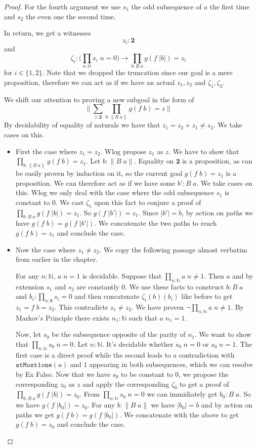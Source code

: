 \documentclass[12pt]{report}
\theoremstyle{definition}
\begin{document}
\begin{proof}
For the fourth argument we use $s_1$ the odd subsequence of $a$ the first time and $s_2$ the even one the second time. 

In return, we get a witnesses 
$$z_i : \mathbf{2}$$
and
$$\zeta_i : \Big(\prod_{n : \mathbb{N}}s_i\; n = 0 \Big)\rightarrow \prod_{b : B\; a} g(f\; |b|) = z_i$$
for $i \in \{1,2\}$.  
Note that we dropped the truncation since our goal is a mere proposition, therefore we can act as if we have an actual $z_1,z_2$ and $\zeta_1, \zeta_2$. 

We shift our attention to proving a new subgoal in the form of 
$$\Big\lVert \sum_{z : \mathbf{2}} \prod_{b : \lVert B\; a\rVert} g(f\; b) = z \Big\rVert$$
By decidability of equality of naturals we have that $z_1 = z_2 + z_1 \neq z_2$. 
We take cases on this. 
\begin{itemize}
\item First the case where $z_1 = z_2$. 
Wlog propose $z_1$ as $z$. 
We have to show that $\prod_{b : \lVert B\;a\rVert}g(f\;b)=z_1$. 
Let $b : \lVert B\;a \rVert$. 
Equality on $\mathbf{2}$ is a proposition, as can be easily proven by induction on it, so the current goal $g(f\;b)=z_1$ is a proposition. 
We can therefore act as if we have some $b' : B\;a$. 
We take cases on this. 
Wlog we only deal with the case where the odd subsequence $s_1$ is constant to $0$. 
We cast $\zeta_1$ upon this fact to conjure a proof of $\prod_{b : B\; a} g(f\; |b|) = z_1$. 
So $g(f\;|b'|) = z_1$. 
Since $|b'| = b$, by action on paths we have $g(f\;b) = g(f\;|b'|)$. 
We concatenate the two paths to reach $g(f\;b) = z_1$ and conclude the case. 

\item Now the case where $z_1 \neq z_2$. 
We copy the following passage almost verbatim from earlier in the chapter. 

For any $n : \mathbb{N}$, $a\; n = 1$ is decidable. 
Suppose that $\prod_{n : 
\mathbb{N}} a\; n \neq 1$. 
Then $a$ and by extension $s_1$ and $s_2$ are constantly $0$. 
We use these facts to construct $b : B\;a$ and $b_i : \prod_{n : \mathtt{N}}s_i = 0$ and then concatenate $\zeta_i(b)(b_i)$ like before to get $z_1 = f\; b = z_2$. 
This contradicts $z_1 \neq z_2$. 
We have proven $\neg \prod_{n : 
\mathbb{N}} a\; n \neq 1$. 
By Markov's Principle there exists $n_1 : \mathbb{N}$ such that $a\; n_1 = 1$. 

Now, let $s_0$ be the subsequence opposite of the parity of $n_1$. 
We want to show that $\prod_{n : \mathbb{N}}s_0\; n = 0$. 
Let $n : \mathbb{N}$. 
It's decidable whether $s_0\;n = 0$ or $s_0\;n=1$. 
The first case is a direct proof while the second leads to a contradiction with $\mathtt{atMost1one}(a)$ and $1$ appearing in both subsequences, which we can resolve by Ex Falso. 
Now that we have $s_0$ to be constant to $0$, we propose the corresponding $z_0$ as $z$ and apply the corresponding $\zeta_0$ to get a proof of $\prod_{b : B\;a}g(f\;|b|) = z_0$. 
From $\prod_{n:\mathbb{N}}s_0\; n = 0$ we can immidiately get $b_0  : B\;a$. 
So we have $g(f\;|b_0|) = z_0$. 
For any $b : \lVert B\;a \rVert$ we have $|b_0| = b$ and by action on paths we get $g(f\;b) = g(f\;|b_0|)$. 
We concatenate with the above to get $g(f\;b) = z_0$ and conclude the case.


\end{itemize}
\end{proof}
\end{document}
